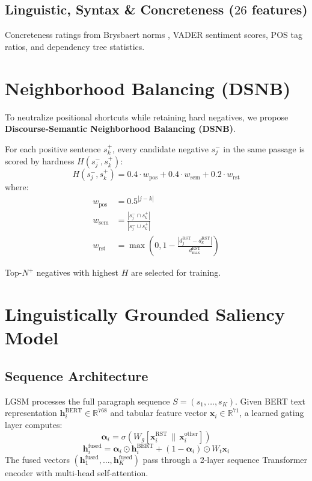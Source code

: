 \documentclass[11pt,a4paper,twocolumn]{article}
\begin{document}
\subsection{Linguistic, Syntax \& Concreteness ($26$ features)}
Concreteness ratings from Brysbaert norms \cite{brysbaert2014concreteness}, VADER sentiment scores, POS tag ratios, and dependency tree statistics.

\section{Neighborhood Balancing (DSNB)}
To neutralize positional shortcuts while retaining hard negatives, we propose \textbf{Discourse-Semantic Neighborhood Balancing (DSNB)}.

For each positive sentence $s_k^+$, every candidate negative $s_j^-$ in the same passage is scored by hardness $H(s_j^-, s_k^+)$:
\begin{equation}
    H(s_j^-, s_k^+) = 0.4 \cdot w_{\text{pos}} + 0.4 \cdot w_{\text{sem}} + 0.2 \cdot w_{\text{rst}}
\end{equation}
where:
\begin{align}
    w_{\text{pos}} &= 0.5^{|j - k|} \\
    w_{\text{sem}} &= \frac{|s_j^- \cap s_k^+|}{|s_j^- \cup s_k^+|} \\
    w_{\text{rst}} &= \max\left(0, 1 - \frac{|d_j^{\text{RST}} - d_k^{\text{RST}}|}{d_{\max}^{\text{RST}}}\right)
\end{align}

Top-$N^+$ negatives with highest $H$ are selected for training.

\section{Linguistically Grounded Saliency Model}
\subsection{Sequence Architecture}
LGSM processes the full paragraph sequence $S = (s_1, \dots, s_K)$. Given BERT text representation $\mathbf{h}_i^{\text{BERT}} \in \mathbb{R}^{768}$ and tabular feature vector $\mathbf{x}_i \in \mathbb{R}^{71}$, a learned gating layer computes:
\begin{equation}
    \boldsymbol{\alpha}_i = \sigma(W_g [\mathbf{x}_i^{\text{RST}} \,\|\, \mathbf{x}_i^{\text{other}}])
\end{equation}
\begin{equation}
    \mathbf{h}_i^{\text{fused}} = \boldsymbol{\alpha}_i \odot \mathbf{h}_i^{\text{BERT}} + (1 - \boldsymbol{\alpha}_i) \odot W_t \mathbf{x}_i
\end{equation}
The fused vectors $(\mathbf{h}_1^{\text{fused}}, \dots, \mathbf{h}_K^{\text{fused}})$ pass through a 2-layer sequence Transformer encoder with multi-head self-attention.
\end{document}
